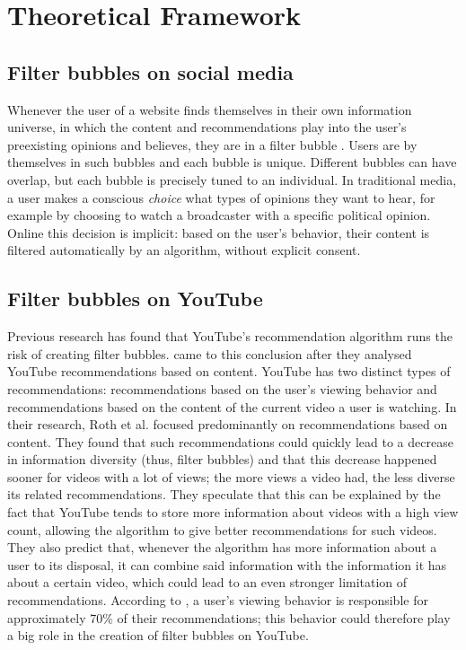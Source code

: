 \documentclass[../main.tex]{subfiles}
\begin{document}
\section{Theoretical Framework}
\subsection{Filter bubbles on social media}
Whenever the user of a website finds themselves in their own information universe, in which the content
and recommendations play into the user's preexisting opinions and believes, they are in a filter bubble
\citep{pariser2011filter}. Users are by themselves in such bubbles and each bubble is unique. Different
bubbles can have overlap, but each bubble is precisely tuned to an individual. In traditional media, a
user makes a conscious \textit{choice} what types of opinions they want to hear, for example by choosing
to watch a broadcaster with a specific political opinion. Online this decision is implicit: based on the
user's behavior, their content is filtered automatically by an algorithm, without explicit consent. 

\subsection{Filter bubbles on YouTube}
Previous research has found that YouTube's recommendation algorithm runs the risk of creating filter
bubbles. \citet{roth2020tubes} came to this conclusion after they analysed YouTube recommendations based
on content. YouTube has two distinct types of recommendations: recommendations based on the user's
viewing behavior and recommendations based on the content of the current video a user is watching. In
their research, Roth et al. focused predominantly on recommendations based on content. They found that
such recommendations could quickly lead to a decrease in information diversity (thus, filter bubbles)
and that this decrease happened sooner for videos with a lot of views; the more views a video had, the
less diverse its related recommendations. They speculate that this can be explained by the fact that
YouTube tends to store more information about videos with a high view count, allowing the algorithm to
give better recommendations for such videos. They also predict that, whenever the algorithm has more
information about a user to its disposal, it can combine said information with the information it has
about a certain video, which could lead to an even stronger limitation of recommendations. According to
\citet{ledwich2020algorithmic}, a user's viewing behavior is responsible for approximately 70\% of their
recommendations; this behavior could therefore play a big role in the creation of filter bubbles on
YouTube. 
\end{document}
